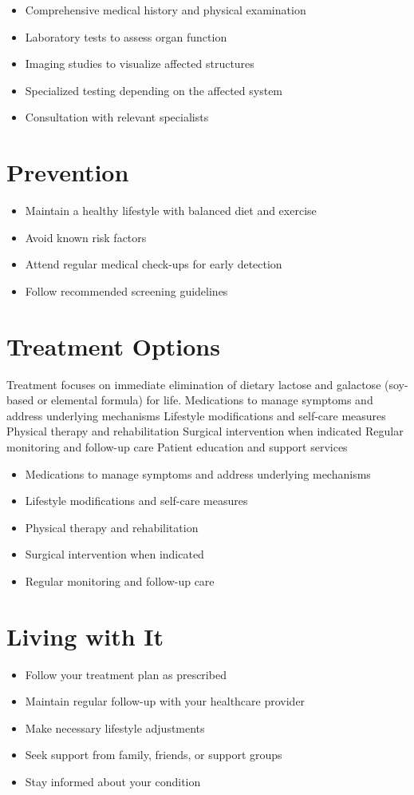 \begin{itemize}[noitemsep]
  \item Comprehensive medical history and physical examination
  \item Laboratory tests to assess organ function
  \item Imaging studies to visualize affected structures
  \item Specialized testing depending on the affected system
  \item Consultation with relevant specialists
\end{itemize}
\section{Prevention}
\begin{itemize}[noitemsep]
  \item Maintain a healthy lifestyle with balanced diet and exercise
  \item Avoid known risk factors
  \item Attend regular medical check-ups for early detection
  \item Follow recommended screening guidelines
\end{itemize}
\section{Treatment Options}
Treatment focuses on immediate elimination of dietary lactose and galactose (soy-based or elemental formula) for life. Medications to manage symptoms and address underlying mechanisms Lifestyle modifications and self-care measures Physical therapy and rehabilitation Surgical intervention when indicated Regular monitoring and follow-up care Patient education and support services

\begin{itemize}[noitemsep]
  \item Medications to manage symptoms and address underlying mechanisms
  \item Lifestyle modifications and self-care measures
  \item Physical therapy and rehabilitation
  \item Surgical intervention when indicated
  \item Regular monitoring and follow-up care
\end{itemize}
\section{Living with It}
\begin{itemize}[noitemsep]
  \item Follow your treatment plan as prescribed
  \item Maintain regular follow-up with your healthcare provider
  \item Make necessary lifestyle adjustments
  \item Seek support from family, friends, or support groups
  \item Stay informed about your condition
\end{itemize}
